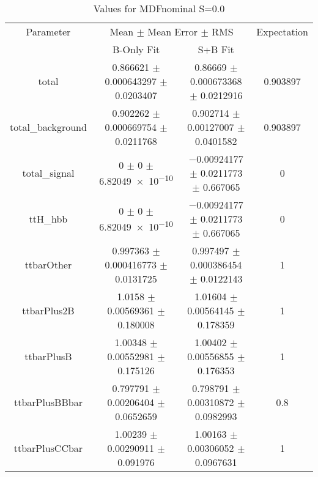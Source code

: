 \begin{table}
\centering
\caption{Values for MDFnominal S=0.0}
\begin{tabular}{cccc}
\toprule
Parameter & \multicolumn{2}{c}{Mean $\pm$ Mean Error $\pm$ RMS} & Expectation\\
 & B-Only Fit & S+B Fit & \\
\midrule
total & \num{0.866621} $\pm$ \num{0.000643297} $\pm$ \num{0.0203407} & \num{0.86669} $\pm$ \num{0.000673368} $\pm$ \num{0.0212916} & \num{0.903897}\\
total\_background & \num{0.902262} $\pm$ \num{0.000669754} $\pm$ \num{0.0211768} & \num{0.902714} $\pm$ \num{0.00127007} $\pm$ \num{0.0401582} & \num{0.903897}\\
total\_signal & \num{0} $\pm$ \num{0} $\pm$ \num{6.82049e-10} & \num{-0.00924177} $\pm$ \num{0.0211773} $\pm$ \num{0.667065} & \num{0}\\
ttH\_hbb & \num{0} $\pm$ \num{0} $\pm$ \num{6.82049e-10} & \num{-0.00924177} $\pm$ \num{0.0211773} $\pm$ \num{0.667065} & \num{0}\\
ttbarOther & \num{0.997363} $\pm$ \num{0.000416773} $\pm$ \num{0.0131725} & \num{0.997497} $\pm$ \num{0.000386454} $\pm$ \num{0.0122143} & \num{1}\\
ttbarPlus2B & \num{1.0158} $\pm$ \num{0.00569361} $\pm$ \num{0.180008} & \num{1.01604} $\pm$ \num{0.00564145} $\pm$ \num{0.178359} & \num{1}\\
ttbarPlusB & \num{1.00348} $\pm$ \num{0.00552981} $\pm$ \num{0.175126} & \num{1.00402} $\pm$ \num{0.00556855} $\pm$ \num{0.176353} & \num{1}\\
ttbarPlusBBbar & \num{0.797791} $\pm$ \num{0.00206404} $\pm$ \num{0.0652659} & \num{0.798791} $\pm$ \num{0.00310872} $\pm$ \num{0.0982993} & \num{0.8}\\
ttbarPlusCCbar & \num{1.00239} $\pm$ \num{0.00290911} $\pm$ \num{0.091976} & \num{1.00163} $\pm$ \num{0.00306052} $\pm$ \num{0.0967631} & \num{1}\\
\bottomrule
\end{tabular}
\end{table}